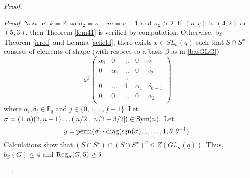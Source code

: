 \begin{proof}
\begin{proof}
Now let $k=2$, so $n_2=n-m=n-1$ and $n_2>2$. If $(n,q)$ is $(4,2)$ or $(5,3)$, then Theorem \ref{lem41} is verified by  computation.  Otherwise,  by Theorem \ref{irred} and Lemma \ref{scfield},
there exists $x \in SL_n(q)$ such that $S \cap S^x$ consists of elements of  shape (with respect to a basis $\beta$ as in \eqref{basGLG})
\begin{equation*} 
\phi^j
  \begin{pmatrix}
\alpha_1 &0 & \dots    & 0 & \delta_1  \\
0 & \alpha_1 & \dots  & 0 & \delta_2 \\
 &  & \ddots  &  &  \\
 0& \dots & 0  & \alpha_{1} & \delta_{n-1} \\
0 & 0 & \dots  & 0 & \alpha_2 \\
\end{pmatrix}
\end{equation*}
where $\alpha_i, \delta_i \in \mathbb{F}_q$ and $j \in \{0,1, \ldots, f-1\}.$
Let $\sigma =(1, n)(2, n - 1) \ldots ([n/2], [n/2 + 3/2]) \in \mathrm{Sym}(n).$ Let $$y = \mathrm{perm}(\sigma) \cdot \mathrm{diag}(\mathrm{sgn}(\sigma), 1, \ldots, 1, \theta, \theta^{-1}).$$ Calculations show that $(S \cap S^x) \cap (S \cap S^x)^y \le Z(GL_n(q)).$
Thus, $b_S(G)\le 4$ and $\mathrm{Reg}_{S}(G,5) \ge 5.$
 

\medskip


\end{proof}
\end{proof}
